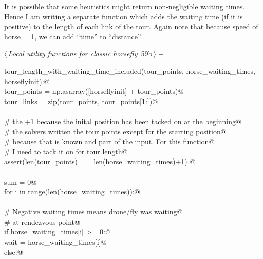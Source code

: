 \documentclass[11.5pt]{report}
\begin{document}
\vspace{-0.8cm}\newchunk It is possible that some heuristics might return non-negligible
      waiting times. Hence I am writing a separate function which
      adds the waiting time (if it is positive) to the length of 
      each link of the tour. Again note that because 
      speed of horse = 1, we can add ``time'' to ``distance''. 

\begin{flushleft} \small\label{scrap82}\raggedright\small
{} $\langle\,${\itshape Local utility functions for classic horsefly}\nobreak\ {\footnotesize {59b}}$\,\rangle\equiv$
\vspace{-1ex}
\begin{list}{}{} \item
\mbox{}\verb@def tour_length_with_waiting_time_included(tour_points, horse_waiting_times, horseflyinit):@\\
\mbox{}\verb@      tour_points   = np.asarray([horseflyinit] + tour_points)@\\
\mbox{}\verb@      tour_links    = zip(tour_points, tour_points[1:])@\\
\mbox{}\verb@@\\
\mbox{}\verb@      # the +1 because the inital position has been tacked on at the beginning@\\
\mbox{}\verb@      # the solvers written the tour points except for the starting position@\\
\mbox{}\verb@      # because that is known and part of the input. For this function@\\
\mbox{}\verb@      # I need to tack it on for tour length@\\
\mbox{}\verb@      assert(len(tour_points) == len(horse_waiting_times)+1) @\\
\mbox{}\verb@@\\
\mbox{}\verb@      sum = 0@\\
\mbox{}\verb@      for i in range(len(horse_waiting_times)):@\\
\mbox{}\verb@@\\
\mbox{}\verb@          # Negative waiting times means drone/fly was waiting@\\
\mbox{}\verb@          # at rendezvous point@\\
\mbox{}\verb@          if horse_waiting_times[i] >= 0:@\\
\mbox{}\verb@              wait = horse_waiting_times[i]@\\
\mbox{}\verb@          else:@\\

\end{list}
\end{flushleft}
\end{document}

